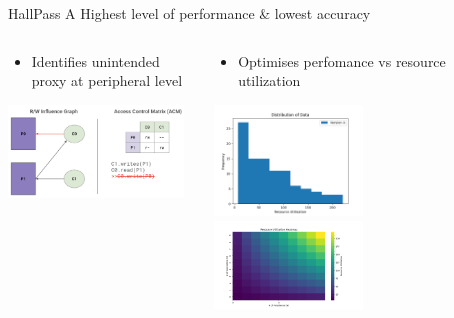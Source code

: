 \begin{frame}{HallPass A}
    Highest level of performance \& lowest accuracy
    \begin{columns}
        \begin{column}{0.5\textwidth}
            \begin{itemize}
                \item Identifies unintended proxy at peripheral level
            \end{itemize}
            \centering
            \includegraphics[height=0.95\textheight,width=0.95\textwidth,keepaspectratio]{images/hallpass_a_acm.png}
        \end{column}
       \begin{column}{0.5\textwidth}
            \begin{itemize}
                \item Optimises perfomance vs resource utilization
            \end{itemize}
            \centering
            \includegraphics[height=0.5\textheight,width=0.5\textwidth,keepaspectratio]{images/hallpass_a_hist.png}
            \includegraphics[height=0.5\textheight,width=0.5\textwidth,keepaspectratio]{images/hallpass_a_util.png}
       \end{column} 
    \end{columns}
\end{frame}

